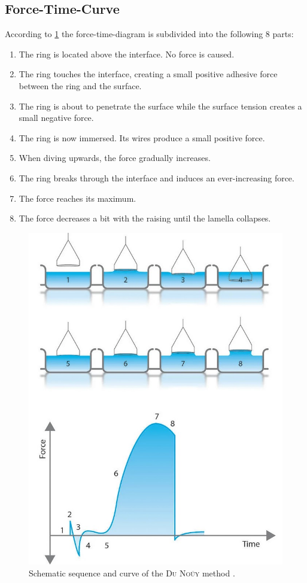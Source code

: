         \subsection{Force-Time-Curve}\label{sec:A1 force time curve}%
            According to \cref{fig:surface_tension_subdivisions} the force-time-diagram is subdivided into the following 8 parts:
            \begin{enumerate}
                \item The ring is located above the interface. No force is caused.
                \item The ring touches the interface, creating a small positive adhesive force between the ring and the surface.
                \item The ring is about to penetrate the surface while the surface tension creates a small negative force.
                \item The ring is now immersed. Its wires produce a small positive force.
                \item When diving upwards, the force gradually increases.
                \item The ring breaks through the interface and induces an ever-increasing force.
                \item The force reaches its maximum.
                \item The force decreases a bit with the raising until the lamella collapses.
            \end{enumerate}
            \newpage
            \begin{figure}[H]
                \centering
                \includegraphics[width=.6\textwidth]{referenzen/surface_tension_subdivisions.jpg}
                \caption[Schematic sequence and curve of the \textsc{Du Noüy} method]{Schematic sequence and curve of the \textsc{Du Noüy} method \cite{Lauren.20210109.3waysMeasureSurfaceTension}.}
                \label{fig:surface_tension_subdivisions}
            \end{figure}
